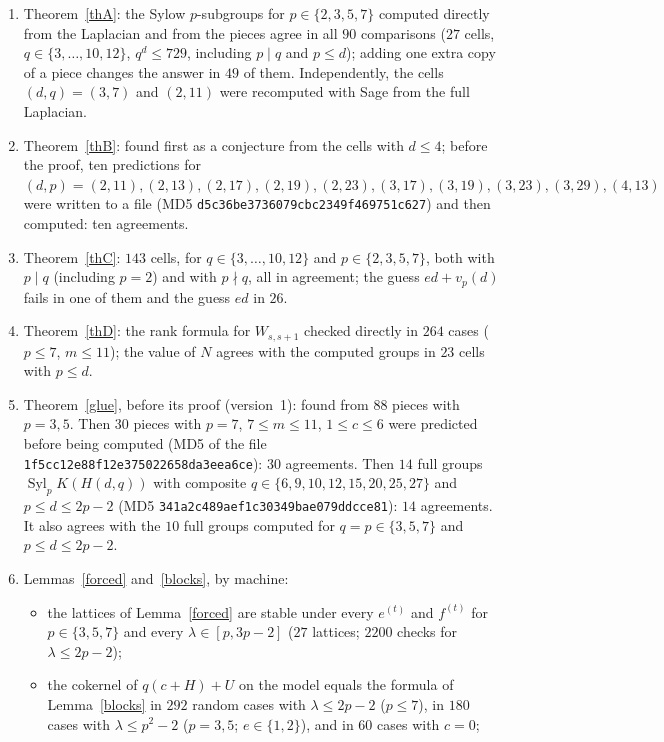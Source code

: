 \documentclass[10pt]{article}
\theoremstyle{ds}
\theoremstyle{dsrem}
\newcommand{\Syl}{\operatorname{Syl}}
\begin{document}
\begin{enumerate}
\item Theorem~\ref{thA}: the Sylow $p$-subgroups for $p\in\{2,3,5,7\}$ computed directly from the Laplacian and from the pieces agree in all $90$ comparisons ($27$ cells, $q\in\{3,\dots,10,12\}$, $q^d\le729$, including $p\mid q$ and $p\le d$); adding one extra copy of a piece changes the answer in $49$ of them. Independently, the cells $(d,q)=(3,7)$ and $(2,11)$ were recomputed with Sage from the full Laplacian.
\item Theorem~\ref{thB}: found first as a conjecture from the cells with $d\le4$; before the proof, ten predictions for $(d,p)=(2,11),\allowbreak (2,13),\allowbreak (2,17),\allowbreak (2,19),\allowbreak (2,23),\allowbreak (3,17),\allowbreak (3,19),\allowbreak (3,23),\allowbreak (3,29),\allowbreak (4,13)$ were written to a file (MD5 \texttt{d5c36be3\allowbreak 736079cb\allowbreak c2349f46\allowbreak 9751c627}) and then computed: ten agreements.
\item Theorem~\ref{thC}: $143$ cells, for $q\in\{3,\dots,10,12\}$ and $p\in\{2,3,5,7\}$, both with $p\mid q$ (including $p=2$) and with $p\nmid q$, all in agreement; the guess $ed+v_p(d)$ fails in one of them and the guess $ed$ in $26$.
\item Theorem~\ref{thD}: the rank formula for $W_{s,s+1}$ checked directly in $264$ cases ($p\le7$, $m\le11$); the value of $N$ agrees with the computed groups in $23$ cells with $p\le d$.
\item Theorem~\ref{glue}, before its proof (version~1): found from $88$ pieces with $p=3,5$. Then $30$ pieces with $p=7$, $7\le m\le11$, $1\le c\le6$ were predicted before being computed (MD5 of the file \texttt{1f5cc12e\allowbreak 88f12e37\allowbreak 5022658d\allowbreak a3eea6ce}): $30$ agreements. Then $14$ full groups $\Syl_pK(H(d,q))$ with composite $q\in\{6,9,10,12,15,20,25,27\}$ and $p\le d\le 2p-2$ (MD5 \texttt{341a2c48\allowbreak 9aef1c30\allowbreak 349bae07\allowbreak 9ddcce81}): $14$ agreements. It also agrees with the $10$ full groups computed for $q=p\in\{3,5,7\}$ and $p\le d\le2p-2$.
\item Lemmas~\ref{forced} and~\ref{blocks}, by machine:
\begin{itemize}
\item the lattices of Lemma~\ref{forced} are stable under every $e^{(t)}$ and $f^{(t)}$ for $p\in\{3,5,7\}$ and every $\lambda\in[p,3p-2]$ ($27$ lattices; $2200$ checks for $\lambda\le2p-2$);
\item the cokernel of $q(c+H)+U$ on the model equals the formula of Lemma~\ref{blocks} in $292$ random cases with $\lambda\le 2p-2$ ($p\le7$), in $180$ cases with $\lambda\le p^2-2$ ($p=3,5$; $e\in\{1,2\}$), and in $60$ cases with $c=0$;

\end{itemize}
\end{enumerate}
\end{document}
